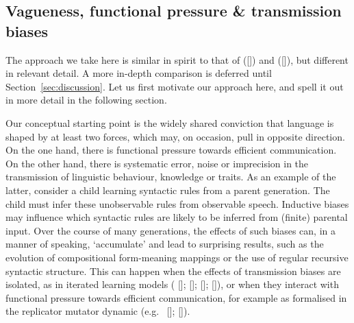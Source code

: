 \documentclass[12pt,english]{article}
\numberwithin{equation}{section}
\newcommand{\citetbjps}[1]{\citeauthor{#1} ([\citeyear{#1}])}
\newcommand{\citealtbjps}[1]{\citeauthor{#1} [\citeyear{#1}]}
\begin{document}
\subsection{Vagueness, functional pressure \& transmission biases}
\label{sec:vagu-funct-press}

The approach we take here is similar in spirit to that of
\citetbjps{FrankeJager2010:Vagueness-Signa} and \citetbjps{OConnor2013:The-Evolution-o}, but different
in relevant detail. A more in-depth comparison is deferred until
Section~\ref{sec:discussion}. Let us first motivate our approach here, and spell it out in more
detail in the following section.

Our conceptual starting point is the widely shared conviction that language is shaped by at
least two forces, which may, on occasion, pull in opposite direction. On the one hand, there is
functional pressure towards efficient communication. On the other hand, there is systematic
error, noise or imprecision in the transmission of linguistic behaviour, knowledge or traits. As
an example of the latter, consider a child learning syntactic rules from a parent
generation. The child must infer these unobservable rules from observable speech. Inductive
biases may influence which syntactic rules are likely to be inferred from (finite) parental
input. Over the course of many generations, the effects of such biases can, in a manner of
speaking, `accumulate' and lead to surprising results, such as the evolution of compositional
form-meaning mappings or the use of regular recursive syntactic structure. This can happen when
the effects of transmission biases are isolated, as in iterated learning models
(\citealtbjps{KirbyHurford2002:The-Emergence-o}; \citealtbjps{SmithKirby2003:Iterated-Learni}; \citealtbjps{GriffithsKalish2007:Language-Evolut}; \citealtbjps{KirbyGriffith2014:Iterated-Learni}),
or when they interact with functional pressure towards efficient communication, for example as
formalised in the replicator mutator dynamic
(e.g.~\citealtbjps{NowakPlotkin2000:The-Evolution-o}; \citealtbjps{NowakKomarova2001:Evolution-of-Un}).
\end{document}
